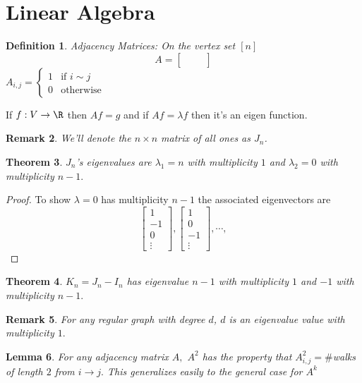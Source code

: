\documentclass[a4paper]{article}
\newtheorem{thm}{Theorem}[section]
\newtheorem{lem}[thm]{Lemma}
\newtheorem{defn}[thm]{Definition}
\newtheorem{rmk}[thm]{Remark}
\begin{document}
\section*{Linear Algebra}
\begin{defn}
    Adjacency Matrices: On the vertex set $[n] $$$A=\begin{bmatrix}
        && \\\\
    \end{bmatrix}$$
    $A_{i,j}=\begin{cases}
        1 & \text{if } i\sim j \\ 0 & \text{otherwise}
    \end{cases}$
\end{defn}
\noindent If $f:V\to \R$ then $Af=g$ and if $Af=\lambda f$ then it's an eigen function. \\
\begin{rmk}
    We'll denote the $n\times n$ matrix of all ones as $J_n$.
\end{rmk}
\begin{thm}
    $J_n$'s eigenvalues are $\lambda_1=n$ with multiplicity $1$ and $\lambda_2=0$ with multiplicity $n-1.$
\end{thm}
\begin{proof}
    To show $\lambda=0$ has multiplicity $n-1$ the associated eigenvectors are $$\begin{bmatrix}
        1 \\ -1 \\0\\\vdots
    \end{bmatrix}, \begin{bmatrix}
        1 \\ 0 \\-1\\\vdots
    \end{bmatrix},\cdots,$$
\end{proof}
\begin{thm}
    $K_n=J_n-I_n$ has eigenvalue $n-1$ with multiplicity $1$ and $-1$ with multiplicity $n-1.$
\end{thm}
\begin{rmk}
    For any regular graph with degree $d$, $d$ is an eigenvalue value with multiplicity $1.$
\end{rmk}
\begin{lem}
    For any adjacency matrix $A,$ $A^2$ has the property that $A^2_{i,j}=\#$walks of length $2$ from $i\to j.$ This generalizes easily to the general case for $A^k$
\end{lem}
\end{document}
